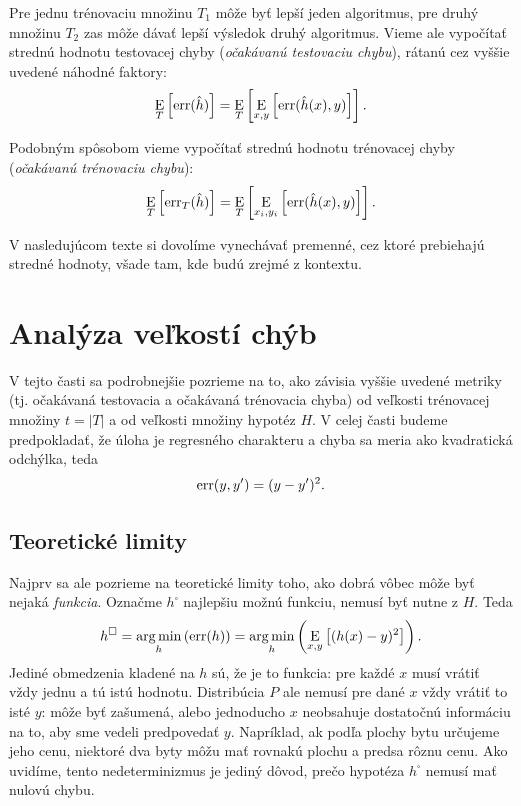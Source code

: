 Pre jednu trénovaciu množinu $T_1$ môže byť lepší jeden algoritmus,
pre druhý množinu $T_2$ zas môže dávať lepší výsledok druhý algoritmus.
Vieme ale vypočítať strednú hodnotu testovacej chyby (\emph{očakávanú
testovaciu chybu}), rátanú cez vyššie uvedené náhodné faktory:
$$\operatorname*{\mathrm{E}}_T \left[ \mathrm{err}(\hat{h}) \right] = \operatorname*{\mathrm{E}}_T \left[ \operatorname*{\mathrm{E}}_{x,y} \left[ \mathrm{err}(\hat{h}(x), y) \right] \right].$$

Podobným spôsobom vieme vypočítať strednú hodnotu trénovacej chyby
(\emph{očakávanú trénovaciu chybu}):
$$\operatorname*{\mathrm{E}}_T \left[ \mathrm{err}_T(\hat{h}) \right] = \operatorname*{\mathrm{E}}_T \left[ \operatorname*{\mathrm{E}}_{x_i,y_i} \left[ \mathrm{err}(\hat{h}(x), y) \right] \right].$$

V nasledujúcom texte si dovolíme vynechávať premenné, cez ktoré prebiehajú
stredné hodnoty, všade tam, kde budú zrejmé z kontextu.




\section{Analýza veľkostí chýb}

V tejto časti sa podrobnejšie pozrieme na to, ako závisia vyššie
uvedené metriky (tj. očakávaná testovacia a očakávaná trénovacia chyba)
od veľkosti trénovacej množiny $t = |T|$ a od veľkosti množiny hypotéz $H$.
V celej časti budeme predpokladať, že úloha je regresného
charakteru a chyba sa meria ako kvadratická odchýlka, teda
$$\mathrm{err}(y, y') = (y - y')^2.$$



\subsection{Teoretické limity}
Najprv sa ale pozrieme na teoretické limity toho, ako dobrá vôbec
môže byť nejaká \emph{funkcia}. Označme $h^{\square}$ najlepšiu možnú
funkciu, nemusí byť nutne z $H$. Teda
$$h^{\square} = \operatorname*{arg\,min}_h \left( \mathrm{err}(h) \right) = \operatorname*{arg\,min}_h \left( \operatorname*{\mathrm{E}}_{x,y} \left[ (h(x) - y)^2 \right] \right).$$
Jediné obmedzenia kladené na $h$ sú, že je to funkcia: pre každé $x$
musí vrátiť vždy jednu a tú istú hodnotu. Distribúcia $P$ ale nemusí
pre dané $x$ vždy vrátiť to isté $y$: môže byť zašumená, alebo jednoducho
$x$ neobsahuje dostatočnú informáciu na to, aby sme vedeli predpovedať $y$.
Napríklad, ak podľa plochy bytu určujeme jeho cenu, niektoré dva byty 
môžu mať rovnakú plochu a predsa rôznu cenu. Ako uvidíme, tento 
nedeterminizmus je jediný dôvod, prečo hypotéza $h^{\square}$ nemusí 
mať nulovú chybu.

